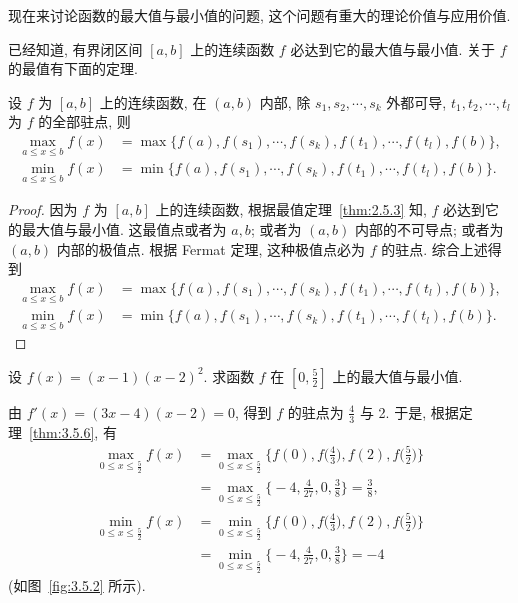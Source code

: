 现在来讨论函数的最大值与最小值的问题, 这个问题有重大的理论价值与应用价值.

已经知道, 有界闭区间 $[a,b]$ 上的连续函数 $f$ 必达到它的最大值与最小值. 关于 $f$ 的最值有下面的定理.

\begin{theorem}\label{thm:3.5.6}
设 $f$ 为 $[a,b]$ 上的连续函数, 在 $(a,b)$ 内部, 除 $s_{1},s_{2},\cdots,s_{k}$ 外都可导, $t_{1},t_{2},\cdots,t_{l}$ 为 $f$ 的全部驻点, 则
\[
\begin{aligned}
\max_{a\leqslant x\leqslant b}f(x)&=\max\{f(a),f(s_{1}),\cdots,f(s_{k}),f(t_{1}),\cdots,f(t_{l}),f(b)\},\\
\min_{a\leqslant x\leqslant b}f(x)&=\min\{f(a),f(s_{1}),\cdots,f(s_{k}),f(t_{1}),\cdots,f(t_{l}),f(b)\}.
\end{aligned}
\]
\end{theorem}

\begin{proof}
因为 $f$ 为 $[a,b]$ 上的连续函数, 根据最值定理~\ref{thm:2.5.3} 知, $f$ 必达到它的最大值与最小值. 这最值点或者为 $a,b$; 或者为 $(a,b)$ 内部的不可导点; 或者为 $(a,b)$ 内部的极值点. 根据 Fermat 定理, 这种极值点必为 $f$ 的驻点. 综合上述得到
\[
\begin{aligned}
\max_{a\leqslant x\leqslant b}f(x)&=\max\{f(a),f(s_{1}),\cdots,f(s_{k}),f(t_{1}),\cdots,f(t_{l}),f(b)\},\\
\min_{a\leqslant x\leqslant b}f(x)&=\min\{f(a),f(s_{1}),\cdots,f(s_{k}),f(t_{1}),\cdots,f(t_{l}),f(b)\}.
\end{aligned}
\]
\end{proof}

\begin{example}\label{ex:3.5.10}
设 $f(x)=(x-1)(x-2)^{2}$. 求函数 $f$ 在 $\left[0,\frac{5}{2}\right]$ 上的最大值与最小值.
\end{example}

\begin{solution}
由 $f'(x)=(3x-4)(x-2)=0$, 得到 $f$ 的驻点为 $\frac{4}{3}$ 与 2. 于是, 根据定理~\ref{thm:3.5.6}, 有
\[
\begin{aligned}
\max_{0\leqslant x\leqslant\frac{5}{2}}f(x)&=\max_{0\leqslant x\leqslant\frac{5}{2}}\Big\{f(0),f\Big(\frac{4}{3}\Big),f(2),f\Big(\frac{5}{2}\Big)\Big\}\\
&=\max_{0\leqslant x\leqslant\frac{5}{2}}\Big\{-4,\frac{4}{27},0,\frac{3}{8}\Big\}=\frac{3}{8},
\end{aligned}
\]
\[
\begin{aligned}
\min_{0\leqslant x\leqslant\frac{5}{2}}f(x)&=\min_{0\leqslant x\leqslant\frac{5}{2}}\Big\{f(0),f\Big(\frac{4}{3}\Big),f(2),f\Big(\frac{5}{2}\Big)\Big\}\\
&=\min_{0\leqslant x\leqslant\frac{5}{2}}\Big\{-4,\frac{4}{27},0,\frac{3}{8}\Big\}=-4
\end{aligned}
\]
(如图~\ref{fig:3.5.2} 所示).
\end{solution}

